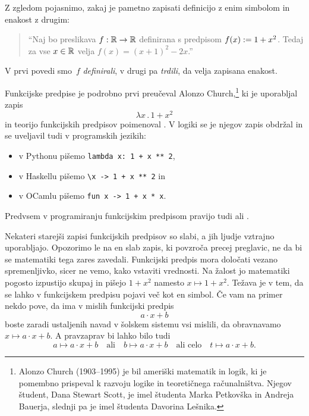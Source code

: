 \begin{zgled}
  Z zgledom pojasnimo, zakaj je pametno zapisati definicijo z enim simbolom in enakost z drugim:
  \begin{quote}
    ``Naj bo preslikava $f : \mathbb{R} \to \mathbb{R}$ definirana s predpisom $f(x) \mathrel{{:}{=}} 1 + x^2$. Tedaj za vse $x \in \mathbb{R}$ velja $f(x) = (x + 1)^2 - 2 x$.'' 
  \end{quote}
  V prvi povedi smo~$f$ \emph{definirali}, v drugi pa \emph{trdili}, da velja zapisana enakost.
\end{zgled}

Funkcijske predpise je podrobno prvi preučeval Alonzo Church,\footnote{Alonzo Church
  (1903--1995) je bil ameriški matematik in logik, ki je pomembno prispeval k razvoju
  logike in teoretičnega računalništva. Njegov študent, Dana Stewart Scott, je imel
  študenta Marka Petkovška in Andreja Bauerja, slednji pa je imel študenta Davorina
  Lešnika.} ki je uporabljal zapis
%
\begin{equation*}
  \lambda x \,.\, 1 + x^2
\end{equation*}
%
in teorijo funkcijskih predpisov poimenoval . V logiki se je njegov
zapis obdržal in se uveljavil tudi v programskih jezikih:
%
\begin{itemize}
\item v Pythonu pišemo \verb|lambda x: 1 + x ** 2|,
\item v Haskellu pišemo \verb|\x -> 1 + x ** 2| in
\item v OCamlu pišemo \verb|fun x -> 1 + x * x|.
\end{itemize}
%
Predvsem v programiranju funkcijskim predpisom pravijo tudi  ali .

Nekateri starejši zapisi funkcijskih predpisov so slabi, a jih ljudje vztrajno
uporabljajo. Opozorimo le na en slab zapis, ki povzroča precej preglavic, ne da bi se
matematiki tega zares zavedali. Funkcijski predpis mora določati vezano spremenljivko,
sicer ne vemo, kako vstaviti vrednosti. Na žalost jo matematiki pogosto izpustijo skupaj
in pišejo $1 + x^2$ namesto $x \mapsto 1 + x^2$.
%
Težava je v tem, da se lahko v funkcijskem predpisu pojavi več kot en simbol. Če vam na primer nekdo pove, da ima v mislih funkcijski predpis
%
\begin{equation*}
  a \cdot x + b
\end{equation*}
%
boste zaradi ustaljenih navad v šolskem sistemu vsi mislili, da obravnavamo $x \mapsto a \cdot x + b$.
%
A pravzaprav bi lahko bilo tudi
%
\begin{equation*}
  a \mapsto a \cdot x + b
  \quad\text{ali}\quad
  b \mapsto a \cdot x + b
  \quad\text{ali celo}\quad
  t \mapsto a \cdot x + b.
\end{equation*}

